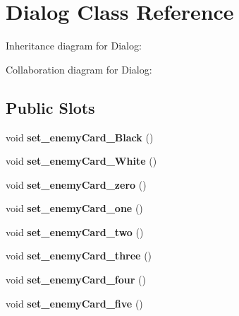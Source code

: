 \hypertarget{classDialog}{}\section{Dialog Class Reference}
\label{classDialog}


Inheritance diagram for Dialog\+:


Collaboration diagram for Dialog\+:
\subsection*{Public Slots}
\begin{DoxyCompactItemize}
\item 
void {\bfseries set\+\_\+enemy\+Card\+\_\+\+Black} ()\hypertarget{classDialog_ac75e5d5a218700d0ee5a3a6b3f1acc6c}{}\label{classDialog_ac75e5d5a218700d0ee5a3a6b3f1acc6c}

\item 
void {\bfseries set\+\_\+enemy\+Card\+\_\+\+White} ()\hypertarget{classDialog_ac8b78f343c46a97ceff6e4a96cb0f59a}{}\label{classDialog_ac8b78f343c46a97ceff6e4a96cb0f59a}

\item 
void {\bfseries set\+\_\+enemy\+Card\+\_\+zero} ()\hypertarget{classDialog_a4e1ab2d5f1d6ae45ebc70b2e993933b4}{}\label{classDialog_a4e1ab2d5f1d6ae45ebc70b2e993933b4}

\item 
void {\bfseries set\+\_\+enemy\+Card\+\_\+one} ()\hypertarget{classDialog_a5ecd629838ad44a0dc98732514f288d9}{}\label{classDialog_a5ecd629838ad44a0dc98732514f288d9}

\item 
void {\bfseries set\+\_\+enemy\+Card\+\_\+two} ()\hypertarget{classDialog_a99eed6f969d942f7c370e5972fb2cf2f}{}\label{classDialog_a99eed6f969d942f7c370e5972fb2cf2f}

\item 
void {\bfseries set\+\_\+enemy\+Card\+\_\+three} ()\hypertarget{classDialog_a8b25b89f562184d329ba567d705a1dab}{}\label{classDialog_a8b25b89f562184d329ba567d705a1dab}

\item 
void {\bfseries set\+\_\+enemy\+Card\+\_\+four} ()\hypertarget{classDialog_aac0bfc9076f91fa10eebcdfea0bbb8c8}{}\label{classDialog_aac0bfc9076f91fa10eebcdfea0bbb8c8}

\item 
void {\bfseries set\+\_\+enemy\+Card\+\_\+five} ()\hypertarget{classDialog_a1fff3013c69c3d8e292ad588dde6090c}{}\label{classDialog_a1fff3013c69c3d8e292ad588dde6090c}


\end{DoxyCompactItemize}
